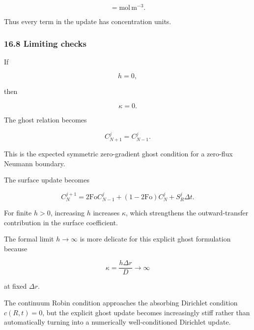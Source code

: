 \documentclass[11pt,a4paper]{article}
\begin{document}
\begin{equation}
[S_R\Delta t]
=
\mathrm{mol\,m^{-3}}.
\tag{TRISO-DIS-446}
\label{eq:triso-dis-446}
\end{equation}

Thus every term in the update has concentration units.

\subsubsection*{16.8 Limiting checks}

If

\begin{equation}
h=0,
\tag{TRISO-DIS-447}
\label{eq:triso-dis-447}
\end{equation}

then

\begin{equation}
\kappa=0.
\tag{TRISO-DIS-448}
\label{eq:triso-dis-448}
\end{equation}

The ghost relation becomes

\begin{equation}
C_{N+1}^j=C_{N-1}^j.
\tag{TRISO-DIS-449}
\label{eq:triso-dis-449}
\end{equation}

This is the expected symmetric zero-gradient ghost condition for a zero-flux Neumann boundary.

The surface update becomes

\begin{equation}
C_N^{j+1}
=
2\mathrm{Fo}C_{N-1}^j
+
(1-2\mathrm{Fo})C_N^j
+
S_R^j\Delta t.
\tag{TRISO-DIS-450}
\label{eq:triso-dis-450}
\end{equation}

For finite $h>0$, increasing $h$ increases $\kappa$, which strengthens the outward-transfer contribution in the surface coefficient.

The formal limit $h\to\infty$ is more delicate for this explicit ghost formulation because

\begin{equation}
\kappa=\frac{h\Delta r}{D}\to\infty
\tag{TRISO-DIS-451}
\label{eq:triso-dis-451}
\end{equation}

at fixed $\Delta r$.

The continuum Robin condition approaches the absorbing Dirichlet condition $c(R,t)=0$, but the explicit ghost update becomes increasingly stiff rather than automatically turning into a numerically well-conditioned Dirichlet update.
\end{document}
